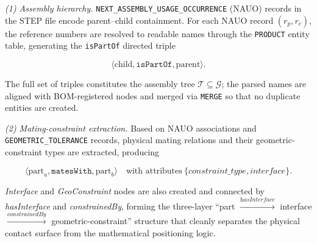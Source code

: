 \documentclass[applsci,article,submit,pdftex,moreauthors]{Definitions/mdpi}
\begin{document}
\textit{(1) Assembly hierarchy.} \texttt{NEXT\_ASSEMBLY\_USAGE\_OCCURRENCE} (NAUO) records in the STEP file encode parent--child containment. For each NAUO record $(r_p, r_c)$, the reference numbers are resolved to readable names through the \texttt{PRODUCT} entity table, generating the \texttt{isPartOf} directed triple
\begin{linenomath}
\begin{equation}
\langle \text{child}, \texttt{isPartOf}, \text{parent}\rangle.
\label{eq:ispartof}
\end{equation}
\end{linenomath}
The full set of triples constitutes the assembly tree $\mathcal{T}\subseteq\mathcal{G}$; the parsed names are aligned with BOM-registered nodes and merged via \texttt{MERGE} so that no duplicate entities are created.

\textit{(2) Mating-constraint extraction.} Based on NAUO associations and \texttt{GEOMETRIC\_TOLERANCE} records, physical mating relations and their geometric-constraint types are extracted, producing
\begin{linenomath}
\begin{equation}
\langle \text{part}_a, \texttt{matesWith}, \text{part}_b\rangle\quad\text{with attributes}\ \{\textit{constraint\_type}, \textit{interface}\}.
\label{eq:mateswith}
\end{equation}
\end{linenomath}
\textit{Interface} and \textit{GeoConstraint} nodes are also created and connected by \textit{hasInterface} and \textit{constrainedBy}, forming the three-layer ``part $\xrightarrow{\textit{hasInterface}}$ interface $\xrightarrow{\textit{constrainedBy}}$ geometric-constraint'' structure that cleanly separates the physical contact surface from the mathematical positioning logic.
\end{document}
